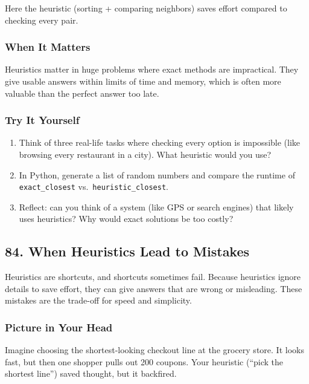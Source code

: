 \documentclass[
  letterpaper,
  DIV=11,
  numbers=noendperiod]{scrreprt}
\providecommand{\tightlist}{%
  \setlength{\itemsep}{0pt}\setlength{\parskip}{0pt}}
\begin{document}
Here the heuristic (sorting + comparing neighbors) saves effort compared
to checking every pair.

\subsubsection{When It Matters}\label{when-it-matters-81}

Heuristics matter in huge problems where exact methods are impractical.
They give usable answers within limits of time and memory, which is
often more valuable than the perfect answer too late.

\subsubsection{Try It Yourself}\label{try-it-yourself-83}

\begin{enumerate}
\def\labelenumi{\arabic{enumi}.}
\tightlist
\item
  Think of three real-life tasks where checking every option is
  impossible (like browsing every restaurant in a city). What heuristic
  would you use?
\item
  In Python, generate a list of random numbers and compare the runtime
  of \texttt{exact\_closest} vs.~\texttt{heuristic\_closest}.
\item
  Reflect: can you think of a system (like GPS or search engines) that
  likely uses heuristics? Why would exact solutions be too costly?
\end{enumerate}

\subsection{84. When Heuristics Lead to
Mistakes}\label{when-heuristics-lead-to-mistakes}

Heuristics are shortcuts, and shortcuts sometimes fail. Because
heuristics ignore details to save effort, they can give answers that are
wrong or misleading. These mistakes are the trade-off for speed and
simplicity.

\subsubsection{Picture in Your Head}\label{picture-in-your-head-84}

Imagine choosing the shortest-looking checkout line at the grocery
store. It looks fast, but then one shopper pulls out 200 coupons. Your
heuristic (``pick the shortest line'') saved thought, but it backfired.
\end{document}
